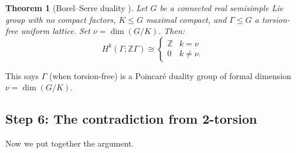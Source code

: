 \documentclass[12pt]{article}
\newtheorem{theorem}{Theorem}
\begin{document}
\begin{theorem}[Borel--Serre duality \cite{BS1973}]\label{thm:BS}
Let $G$ be a connected real semisimple Lie group with no compact factors, $K \leq G$ maximal compact, and $\Gamma \leq G$ a torsion-free uniform lattice. Set $\nu = \dim(G/K)$. Then:
\[
H^k(\Gamma; \mathbb{Z}\Gamma) \cong \begin{cases} \mathbb{Z} & k = \nu \\ 0 & k \neq \nu. \end{cases}
\]
\end{theorem}

This says $\Gamma$ (when torsion-free) is a Poincar\'{e} duality group of formal dimension $\nu = \dim(G/K)$.

\subsection{Step 6: The contradiction from 2-torsion}

Now we put together the argument.
\end{document}
